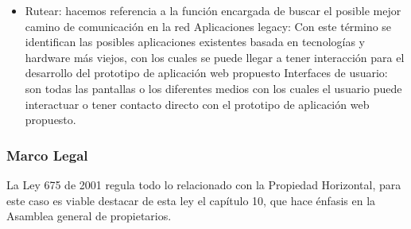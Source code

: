\begin{itemize}
\item Rutear: hacemos referencia a la función encargada de buscar el posible mejor camino de comunicación en la red
Aplicaciones legacy: Con este término se identifican las posibles aplicaciones existentes basada en tecnologías y hardware más viejos, con los cuales se puede llegar a tener interacción para el desarrollo del prototipo de aplicación web propuesto
Interfaces de usuario: son todas las pantallas o los diferentes medios con los cuales el usuario puede interactuar o tener contacto directo con el prototipo de aplicación web propuesto.
\end{itemize}

\subsubsection{Marco Legal}

La Ley 675 de 2001 regula todo lo relacionado con la Propiedad Horizontal, para este caso es viable destacar de esta ley el capítulo 10, que hace énfasis en la Asamblea general de propietarios.\cite{WEB6} 

